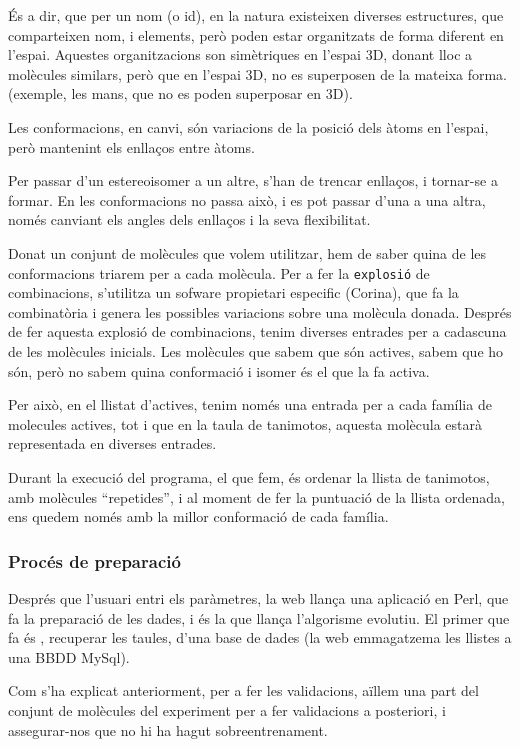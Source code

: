\documentclass[titlepage,a4paper,12pt]{book}
\begin{document}
És a dir, que per un nom (o id), en la natura existeixen diverses estructures, que
comparteixen nom, i elements, però poden estar organitzats de forma diferent en
l'espai. Aquestes organitzacions son simètriques en l'espai 3D, donant lloc a
molècules similars, però que en l'espai 3D, no es superposen de la mateixa
forma. (exemple, les mans, que no es poden superposar en 3D).

Les conformacions, en canvi, són variacions de la posició dels àtoms en l'espai,
però mantenint els enllaços entre àtoms.

Per passar d'un estereoisomer a un altre, s'han de trencar enllaços, i tornar-se
a formar.  En les conformacions no passa això, i es pot passar d'una a una
altra, només canviant els angles dels enllaços i la seva flexibilitat. 

Donat un conjunt de molècules que volem utilitzar, hem de saber quina de les
conformacions triarem per a cada molècula.  Per a fer la \texttt{explosió} de
combinacions, s'utilitza un sofware propietari especific (Corina), que fa la
combinatòria i genera les possibles variacions sobre una molècula donada.
Després de fer aquesta explosió de combinacions, tenim diverses entrades per a
cadascuna de les molècules inicials.  Les molècules que sabem que són actives,
sabem que ho són, però no sabem quina conformació i isomer és el que la fa
activa.

Per això, en el llistat d'actives, tenim només una entrada per a cada família de
molecules actives, tot i que en la taula de tanimotos, aquesta molècula estarà
representada en diverses entrades. 

Durant la execució del programa, el que fem, és ordenar la llista de tanimotos,
amb molècules ``repetides'', i al moment de fer la puntuació de la llista
ordenada, ens quedem només amb la millor conformació de cada família.

\subsubsection{Procés de preparació} %
\label{ssub:Proces de preparacio}

Després que l'usuari entri els paràmetres, la web llança una aplicació en Perl,
que fa la preparació de les dades, i és la que llança l'algorisme evolutiu.  El
primer que fa és , recuperar les taules, d'una base de dades (la web emmagatzema
les llistes a una BBDD MySql).

Com s'ha explicat anteriorment, per a fer les validacions, aïllem una part del
conjunt de molècules del experiment per a fer validacions a posteriori, i
assegurar-nos que no hi ha hagut sobreentrenament.
\end{document}
